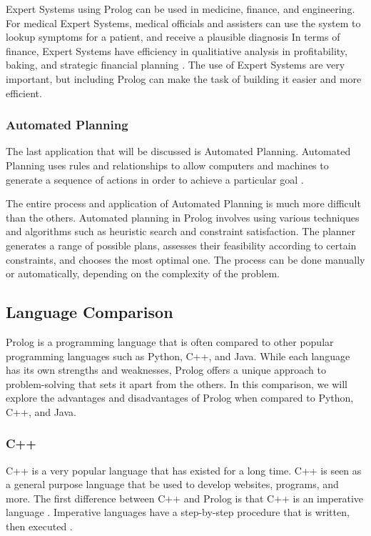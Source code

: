 \documentclass{article}
\theoremstyle{theorem}
\theoremstyle{definition}
\theoremstyle{remark}
\begin{document}
\noindent\newline Expert Systems using Prolog can be used in medicine, finance, and engineering. For medical Expert Systems, medical officials and assisters can use the system to lookup symptoms for a patient, and receive a plausible diagnosis \cite{(25)} In terms of finance, Expert Systems have efficiency in qualitiative analysis in profitability, baking, and strategic financial planning \cite{(26)}. The use of Expert Systems are very important, but including Prolog can make the task of building it easier and more efficient. 


\subsubsection{Automated Planning}
\noindent\newline The last application that will be discussed is Automated Planning. Automated Planning uses rules and relationships to allow computers and machines to generate a sequence of actions in order to achieve a particular goal \cite{(27)}. 

\noindent\newline The entire process  and application of Automated Planning is much more difficult than the others. Automated planning in Prolog involves using various techniques and algorithms such as heuristic search and constraint satisfaction. The planner generates a range of possible plans, assesses their feasibility according to certain constraints, and chooses the most optimal one. The process can be done manually or automatically, depending on the complexity of the problem.


\subsection{Language Comparison}
Prolog is a programming language that is often compared to other popular programming languages such as Python, C++, and Java. While each language has its own strengths and weaknesses, Prolog offers a unique approach to problem-solving that sets it apart from the others. In this comparison, we will explore the advantages and disadvantages of Prolog when compared to Python, C++, and Java.

\subsubsection{C++}
\noindent\newline C++ is a very popular language that has existed for a long time. C++ is seen as a general purpose language that be used to develop websites, programs, and more. The first difference between C++ and Prolog is that C++ is an imperative language \cite{(28)}. Imperative languages have a step-by-step procedure that is written, then executed \cite{(29)}. 
\end{document}
